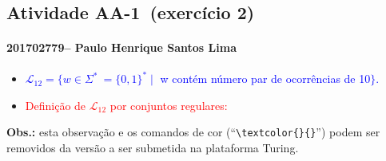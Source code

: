 \documentclass[12pt]{article}
\def\discente{Paulo Henrique Santos Lima}
\def\matricula{201702779}
\def\aa{1}
\def\exercicio{2}
\def\myling{12} %
\newcommand{\concatL}{\ensuremath{{\scriptstyle\circ}}}
\begin{document}
\subsection*{Atividade AA-\aa\ (exercício \exercicio)}
 \paragraph{\matricula -- \discente}
%
 \begin{itemize}
  \item \textcolor{blue}{$\mathcal{L}_\myling = \{w\in\Sigma^*\ = \{0,1\}^*\mid$  w contém número par de ocorrências de 10$\}$.}
%
  \item  \textcolor{red}{Definição de $\mathcal{L}_\myling$ por conjuntos regulares:
%
  }
% 
 \end{itemize}
\noindent\textbf{Obs.:} esta observação e os comandos de cor (``\verb|\textcolor{}{}|'') podem ser removidos da versão a ser submetida na plataforma Turing.
\end{document}

